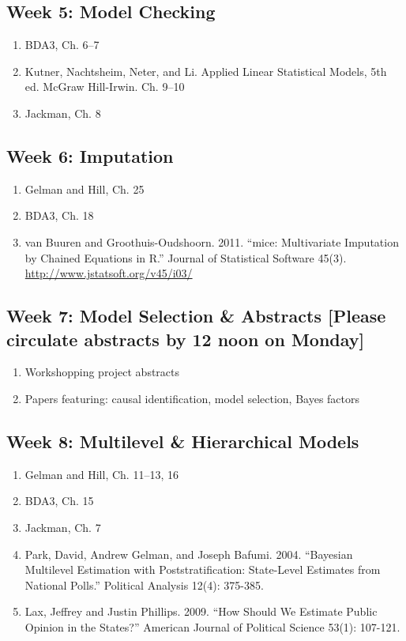 \documentclass[11pt, leqno, fleqn]{article}
\begin{document}
\subsection*{Week 5: Model Checking}
	\begin{enumerate}
	\item[] BDA3, Ch. 6--7
	\item[] Kutner, Nachtsheim, Neter, and Li. Applied Linear Statistical Models, 5th ed.
McGraw Hill-Irwin. Ch. 9--10
	\item[] Jackman, Ch. 8
	\end{enumerate}
\subsection*{Week 6: Imputation}
	\begin{enumerate}
	\item[] Gelman and Hill, Ch. 25
	\item[] BDA3, Ch. 18
	\item[] van Buuren and Groothuis-Oudshoorn. 2011. ``mice: Multivariate Imputation
by Chained Equations in R.'' Journal of Statistical Software 45(3). \url{http://www.jstatsoft.org/v45/i03/}
	\end{enumerate}
\subsection*{Week 7: Model Selection \& Abstracts [Please circulate abstracts by 12 noon on Monday]}
	\begin{enumerate}
	\item[] Workshopping project abstracts
	\item[] Papers featuring: causal identification, model selection, Bayes factors
	\end{enumerate}
\subsection*{Week 8: Multilevel \& Hierarchical Models}
	\begin{enumerate}
	\item[] Gelman and Hill, Ch. 11--13, 16
	\item[] BDA3, Ch. 15
	\item[] Jackman, Ch. 7
	\item[] Park, David, Andrew Gelman, and Joseph Bafumi. 2004. ``Bayesian Multilevel Estimation with Poststratification: State-Level Estimates from National Polls.'' Political Analysis 12(4): 375-385.
	\item[] Lax, Jeffrey and Justin Phillips. 2009. ``How Should We Estimate Public Opinion in the States?'' American Journal of Political Science 53(1): 107-121.
	\end{enumerate}
\end{document}
